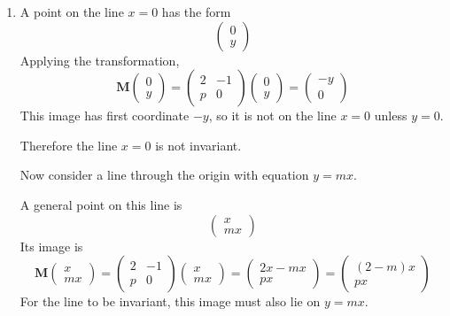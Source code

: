 \documentclass[leqno]{article}
\begin{document}
\begin{enumerate}[
  label=\textbf{\arabic*.},
  leftmargin=*,
  topsep=0pt,
  partopsep=0pt,
  parsep=0pt
]
\vspace*{30pt}

\begin{tcolorbox}[colback=white, colframe=scarlet, title={\textbf{Solution}}, breakable, grow to left by=6mm, grow to right by=10mm]
\begin{enumerate}[label=\textbf{(\alph*)}]
  \item A point on the line $x=0$ has the form
  \[
  \begin{pmatrix}0\\y\end{pmatrix}
  \]
  Applying the transformation,
  \[
  \mathbf{M}\begin{pmatrix}0\\y\end{pmatrix}
  =
  \begin{pmatrix}2&-1\\ p&0\end{pmatrix}
  \begin{pmatrix}0\\y\end{pmatrix}
  =
  \begin{pmatrix}-y\\0\end{pmatrix}
  \]
  This image has first coordinate $-y$, so it is not on the line $x=0$ unless $y=0$.

  Therefore the line $x=0$ is not invariant.

  Now consider a line through the origin with equation $y=mx$.

  A general point on this line is
  \[
  \begin{pmatrix}x\\mx\end{pmatrix}
  \]
  Its image is
  \[
  \mathbf{M}\begin{pmatrix}x\\mx\end{pmatrix}
  =
  \begin{pmatrix}2&-1\\ p&0\end{pmatrix}
  \begin{pmatrix}x\\mx\end{pmatrix}
  =
  \begin{pmatrix}2x-mx\\ px\end{pmatrix}
  =
  \begin{pmatrix}(2-m)x\\ px\end{pmatrix}
  \]
  For the line to be invariant, this image must also lie on $y=mx$.


\end{enumerate}
\end{tcolorbox}
\end{enumerate}
\end{document}
